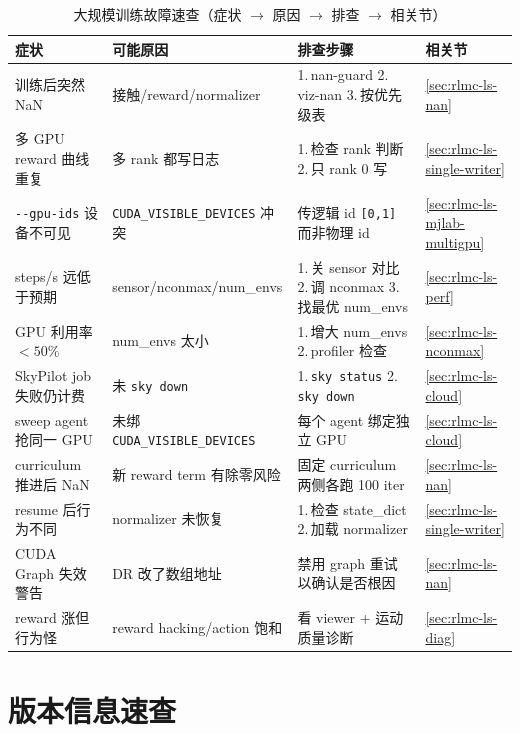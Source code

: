 \begin{table}[H]\centering\small
\caption{大规模训练故障速查（症状 $\to$ 原因 $\to$ 排查 $\to$ 相关节）}
\label{tab:rlmc-ls-troubleshoot}
\begin{tabular}{@{}p{3.4cm}p{2.8cm}p{3.6cm}p{2.0cm}@{}}
\toprule
症状 & 可能原因 & 排查步骤 & 相关节 \\
\midrule
训练后突然 NaN & 接触/reward/normalizer & 1.\,nan-guard 2.\,viz-nan 3.\,按优先级表 & \cref{sec:rlmc-ls-nan} \\
多 GPU reward 曲线重复 & 多 rank 都写日志 & 1.\,检查 rank 判断 2.\,只 rank 0 写 & \cref{sec:rlmc-ls-single-writer} \\
\verb|--gpu-ids| 设备不可见 & \verb|CUDA_VISIBLE_DEVICES| 冲突 & 传逻辑 id \verb|[0,1]| 而非物理 id & \cref{sec:rlmc-ls-mjlab-multigpu} \\
steps/s 远低于预期 & sensor/nconmax/num\_envs & 1.\,关 sensor 对比 2.\,调 nconmax 3.\,找最优 num\_envs & \cref{sec:rlmc-ls-perf} \\
GPU 利用率 $<50\%$ & num\_envs 太小 & 1.\,增大 num\_envs 2.\,profiler 检查 & \cref{sec:rlmc-ls-nconmax} \\
SkyPilot job 失败仍计费 & 未 \verb|sky down| & 1.\,\verb|sky status| 2.\,\verb|sky down| & \cref{sec:rlmc-ls-cloud} \\
sweep agent 抢同一 GPU & 未绑 \verb|CUDA_VISIBLE_DEVICES| & 每个 agent 绑定独立 GPU & \cref{sec:rlmc-ls-cloud} \\
curriculum 推进后 NaN & 新 reward term 有除零风险 & 固定 curriculum 两侧各跑 100 iter & \cref{sec:rlmc-ls-nan} \\
resume 后行为不同 & normalizer 未恢复 & 1.\,检查 state\_dict 2.\,加载 normalizer & \cref{sec:rlmc-ls-single-writer} \\
CUDA Graph 失效警告 & DR 改了数组地址 & 禁用 graph 重试以确认是否根因 & \cref{sec:rlmc-ls-nan} \\
reward 涨但行为怪 & reward hacking/action 饱和 & 看 viewer + 运动质量诊断 & \cref{sec:rlmc-ls-diag} \\
\bottomrule
\end{tabular}
\end{table}

\section{版本信息速查}
\label{sec:rlmc-ls-versions}

